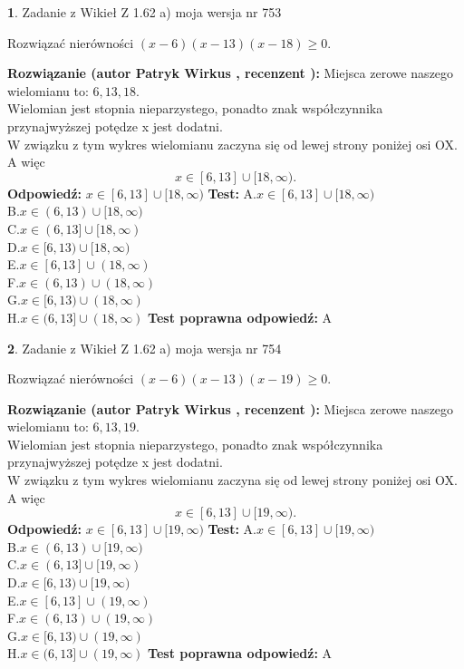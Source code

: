 \documentclass[12pt, a4paper]{article}
\theoremstyle{definition} %
\newtheorem{zad}{}
\newcommand{\zadStart}[1]{\begin{zad}#1\newline}
\newcommand{\zadStop}{\end{zad}}
\newcommand{\rozwStart}[2]{\noindent \textbf{Rozwiązanie (autor #1 , recenzent #2): }\newline}
\newcommand{\rozwStop}{\newline}
\newcommand{\odpStart}{\noindent \textbf{Odpowiedź:}\newline}
\newcommand{\odpStop}{\newline}
\newcommand{\testStart}{\noindent \textbf{Test:}\newline}
\newcommand{\testStop}{\newline}
\newcommand{\kluczStart}{\noindent \textbf{Test poprawna odpowiedź:}\newline}
\newcommand{\kluczStop}{\newline}
\begin{document}
\zadStart{Zadanie z Wikieł Z 1.62 a) moja wersja nr 753}

Rozwiązać nierówności $(x-6)(x-13)(x-18)\ge0$.
\zadStop
\rozwStart{Patryk Wirkus}{}
Miejsca zerowe naszego wielomianu to: $6, 13, 18$.\\
Wielomian jest stopnia nieparzystego, ponadto znak współczynnika przy\linebreak najwyższej potędze x jest dodatni.\\ W związku z tym wykres wielomianu zaczyna się od lewej strony poniżej osi OX. A więc $$x \in [6,13] \cup [18,\infty).$$
\rozwStop
\odpStart
$x \in [6,13] \cup [18,\infty)$
\odpStop
\testStart
A.$x \in [6,13] \cup [18,\infty)$\\
B.$x \in (6,13) \cup [18,\infty)$\\
C.$x \in (6,13] \cup [18,\infty)$\\
D.$x \in [6,13) \cup [18,\infty)$\\
E.$x \in [6,13] \cup (18,\infty)$\\
F.$x \in (6,13) \cup (18,\infty)$\\
G.$x \in [6,13) \cup (18,\infty)$\\
H.$x \in (6,13] \cup (18,\infty)$
\testStop
\kluczStart
A
\kluczStop



\zadStart{Zadanie z Wikieł Z 1.62 a) moja wersja nr 754}

Rozwiązać nierówności $(x-6)(x-13)(x-19)\ge0$.
\zadStop
\rozwStart{Patryk Wirkus}{}
Miejsca zerowe naszego wielomianu to: $6, 13, 19$.\\
Wielomian jest stopnia nieparzystego, ponadto znak współczynnika przy\linebreak najwyższej potędze x jest dodatni.\\ W związku z tym wykres wielomianu zaczyna się od lewej strony poniżej osi OX. A więc $$x \in [6,13] \cup [19,\infty).$$
\rozwStop
\odpStart
$x \in [6,13] \cup [19,\infty)$
\odpStop
\testStart
A.$x \in [6,13] \cup [19,\infty)$\\
B.$x \in (6,13) \cup [19,\infty)$\\
C.$x \in (6,13] \cup [19,\infty)$\\
D.$x \in [6,13) \cup [19,\infty)$\\
E.$x \in [6,13] \cup (19,\infty)$\\
F.$x \in (6,13) \cup (19,\infty)$\\
G.$x \in [6,13) \cup (19,\infty)$\\
H.$x \in (6,13] \cup (19,\infty)$
\testStop
\kluczStart
A
\kluczStop
\end{document}

